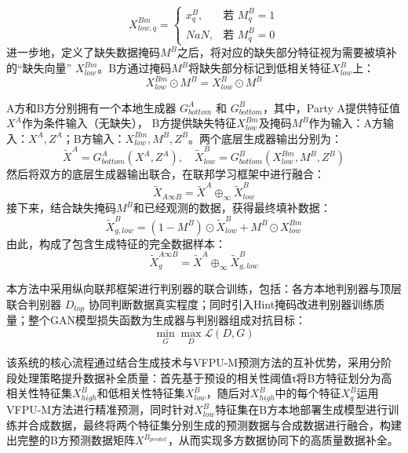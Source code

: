 \begin{equation}
	X_{low,q}^{Bm} = 
	\begin{cases}
		x_q^B, & \text{若 } M_q^B=1\\[6pt]
		NaN, & \text{若 } M_q^B=0
	\end{cases}
\end{equation}
进一步地，定义了缺失数据掩码$M^B$之后，将对应的缺失部分特征视为需要被填补的“缺失向量” $X^{Bm}_{low}$。B方通过掩码$M^B$将缺失部分标记到低相关特征$X^B_{low}$上：
\begin{equation}
	X_{low}^{Bm} \odot M^B = X_{low}^{B}\odot M^B
\end{equation}

A方和B方分别拥有一个本地生成器 $G_{bottom}^A$ 和 $G_{bottom}^B$，其中，Party A提供特征值$X^A$作为条件输入（无缺失）， B方提供缺失特征$X^{Bm}_{low}$及掩码$M^B$作为输入：A方输入：$X^A, Z^A$；B方输入：$X^{Bm}_{low}, M^B, Z^B$。两个底层生成器输出分别为：
\begin{equation}
	\tilde{X}^A=G_{bottom}^A(X^{A},Z^A), \quad
	\tilde{X}^B_{low}=G_{bottom}^B(X^{Bm}_{low},M^B,Z^B)
\end{equation}
然后将双方的底层生成器输出联合，在联邦学习框架中进行融合：
\begin{equation}
	\tilde{X}_{A\infty B}=\tilde{X}^A\oplus_{\infty}\tilde{X}^B_{low}
\end{equation}
接下来，结合缺失掩码$M^B$和已经观测的数据，获得最终填补数据：
\begin{equation}
	\tilde{X}_{g,low}^{B} = (1-M^B)\odot\tilde{X}_{low}^B + M^B\odot X_{low}^{Bm}
\end{equation}
由此，构成了包含生成特征的完全数据样本：
\begin{equation}
	\tilde{X}_{g}^{A\infty B}=\tilde{X}^A\oplus_{\infty}\tilde{X}_{g,low}^B
\end{equation}

本方法中采用纵向联邦框架进行判别器的联合训练，包括：各方本地判别器与顶层联合判别器 $D_{top}$ 协同判断数据真实程度；同时引入Hint掩码改进判别器训练质量；整个GAN模型损失函数为生成器与判别器组成对抗目标：
\begin{equation}
\min_{G}\max_{D}\mathcal{L}(D,G)
\end{equation}

该系统的核心流程通过结合生成技术与VFPU-M预测方法的互补优势，采用分阶段处理策略提升数据补全质量：首先基于预设的相关性阈值τ将B方特征划分为高相关性特征集$X^B_{high}$和低相关性特征集$X^B_{low}$，随后对$X^B_{high}$中的每个特征$X^B_q$运用VFPU-M方法进行精准预测，同时针对$X^B_{low}$特征集在B方本地部署生成模型进行训练并合成数据，最终将两个特征集分别生成的预测数据与合成数据进行融合，构建出完整的B方预测数据矩阵$X^{B_{predict}}$，从而实现多方数据协同下的高质量数据补全。

